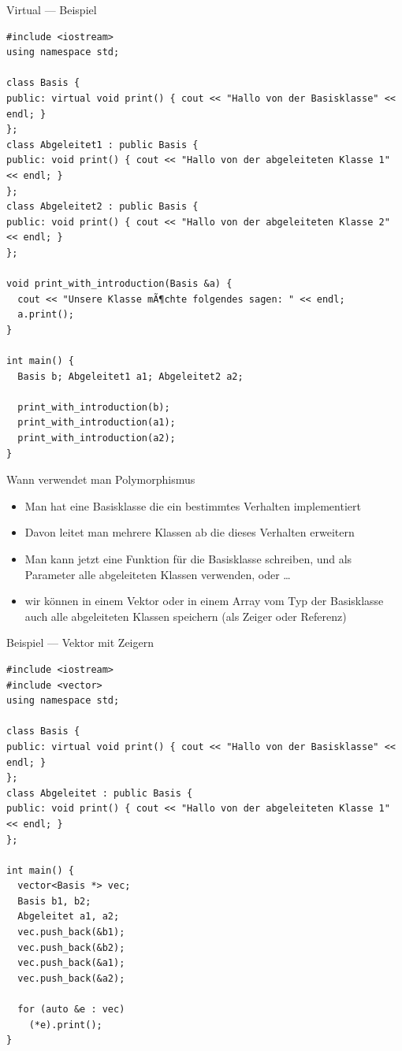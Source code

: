 \documentclass[presentation]{beamer}
\begin{document}
\begin{frame}[label={sec:org2686708},fragile]{Virtual --- Beispiel}
 \begin{verbatim}
#include <iostream>
using namespace std;

class Basis {
public: virtual void print() { cout << "Hallo von der Basisklasse" << endl; }
};
class Abgeleitet1 : public Basis {
public: void print() { cout << "Hallo von der abgeleiteten Klasse 1" << endl; }
};
class Abgeleitet2 : public Basis {
public: void print() { cout << "Hallo von der abgeleiteten Klasse 2" << endl; }
};

void print_with_introduction(Basis &a) {
  cout << "Unsere Klasse mÃ¶chte folgendes sagen: " << endl;
  a.print();
}

int main() {
  Basis b; Abgeleitet1 a1; Abgeleitet2 a2;

  print_with_introduction(b);
  print_with_introduction(a1);
  print_with_introduction(a2);
}
\end{verbatim}
\end{frame}
\begin{frame}[label={sec:org268836a}]{Wann verwendet man Polymorphismus}
\begin{itemize}
\item Man hat eine Basisklasse die ein bestimmtes Verhalten implementiert
\item Davon leitet man mehrere Klassen ab die dieses Verhalten erweitern
\item Man kann jetzt eine Funktion für die Basisklasse schreiben, und als
Parameter alle abgeleiteten Klassen verwenden, oder \ldots{}
\item wir können in einem Vektor oder in einem Array vom Typ der
Basisklasse auch alle abgeleiteten Klassen speichern (als Zeiger
oder Referenz)
\end{itemize}
\end{frame}
\begin{frame}[label={sec:orge98b75b},fragile]{Beispiel --- Vektor mit Zeigern}
 \begin{verbatim}
#include <iostream>
#include <vector>
using namespace std;

class Basis {
public: virtual void print() { cout << "Hallo von der Basisklasse" << endl; }
};
class Abgeleitet : public Basis {
public: void print() { cout << "Hallo von der abgeleiteten Klasse 1" << endl; }
};

int main() {
  vector<Basis *> vec;
  Basis b1, b2;
  Abgeleitet a1, a2;
  vec.push_back(&b1);
  vec.push_back(&b2);
  vec.push_back(&a1);
  vec.push_back(&a2);

  for (auto &e : vec)
    (*e).print();
}
\end{verbatim}
\end{frame}
\end{document}
